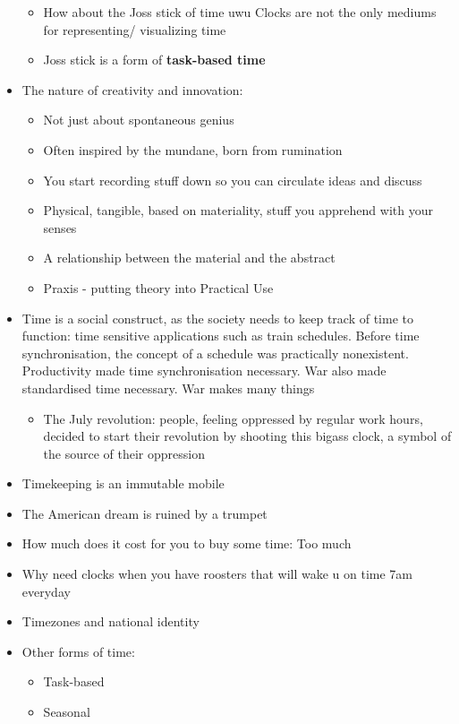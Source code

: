 \documentclass[a4paper]{article}
\begin{document}
\begin{itemize}
	\begin{itemize}[label=$\circ$]
		\item How about the Joss stick of time uwu Clocks are not the only mediums for representing/ visualizing time
		\item Joss stick is a form of \textbf{task-based time}
	\end{itemize}
	\newpage
	\item The nature of creativity and innovation:
	\begin{itemize}[label=$\circ$]
		\item Not just about spontaneous genius
		\item Often inspired by the mundane, born from rumination
		\item You start recording stuff down so you can circulate ideas and discuss
		\item Physical, tangible, based on materiality, stuff you apprehend with your senses
		\item A relationship between the material and the abstract
		\item Praxis - putting theory into Practical Use
	\end{itemize}
	\item Time is a social construct, as the society needs to keep track of time to function: time sensitive applications such as train schedules. Before time synchronisation, the concept of a schedule was practically nonexistent. Productivity made time synchronisation necessary. War also made standardised time necessary. War makes many things
	\begin{itemize}[label=$\circ$]
		\item The July revolution: people, feeling oppressed by regular work hours, decided to start their revolution by shooting this bigass clock, a symbol of the source of their oppression
	\end{itemize}
	\item Timekeeping is an immutable mobile
	\item The American dream is ruined by a trumpet
	\item How much does it cost for you to buy some time: Too much
	\item Why need clocks when you have roosters that will wake u on time 7am everyday
	\item Timezones and national identity
	\item Other forms of time:
	\begin{itemize}[label=$\circ$]
		\item Task-based
		\item Seasonal
	\end{itemize}
\end{itemize}
\end{document}
